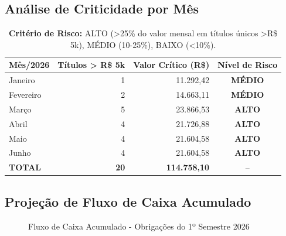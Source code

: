 \documentclass[12pt, a4paper]{article}
\begin{document}
\newpage

\subsection{Análise de Criticidade por Mês}

\begin{table}[H]
    \centering
    \renewcommand{\arraystretch}{1.4}
    \begin{tabularx}{\textwidth}{X r r c}
        \toprule
        \rowcolor{tableHeader} \textbf{Mês/2026} & \textbf{Títulos > R\$ 5k} & \textbf{Valor Crítico (R\$)} & \textbf{Nível de Risco} \\
        \midrule
        Janeiro & 1 & 11.292,42 & \cellcolor{orange!30} \textbf{MÉDIO} \\
        Fevereiro & 2 & 14.663,11 & \cellcolor{orange!30} \textbf{MÉDIO} \\
        Março & 5 & 23.866,53 & \cellcolor{accentColor!30} \textbf{ALTO} \\
        Abril & 4 & 21.726,88 & \cellcolor{accentColor!30} \textbf{ALTO} \\
        Maio & 4 & 21.604,58 & \cellcolor{accentColor!30} \textbf{ALTO} \\
        Junho & 4 & 21.604,58 & \cellcolor{accentColor!30} \textbf{ALTO} \\
        \midrule
        \rowcolor{lightGray} \textbf{TOTAL} & \textbf{20} & \textbf{114.758,10} & -- \\
        \bottomrule
    \end{tabularx}
    \caption*{\footnotesize \textbf{Critério de Risco:} ALTO (>25\% do valor mensal em títulos únicos >R\$ 5k), MÉDIO (10-25\%), BAIXO (<10\%).}
\end{table}

\subsection{Projeção de Fluxo de Caixa Acumulado}

\begin{figure}[H]
    \centering
    \caption{Fluxo de Caixa Acumulado - Obrigações do 1º Semestre 2026}
\end{figure}
\end{document}
